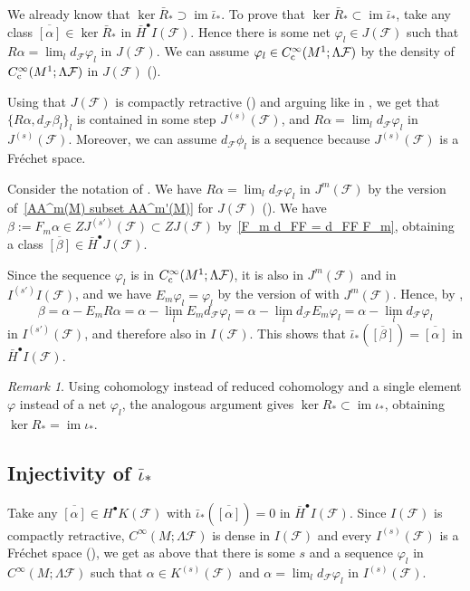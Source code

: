 \documentclass{memo-l}
\theoremstyle{plain}
\theoremstyle{definition}
\theoremstyle{remark}
\newtheorem{rem}[thm]{Remark}
\newcommand{\FF}{\mathcal{F}}
\newcommand{\im}{\operatorname{im}}
\newcommand{\Cinftyc}{C^\infty_{\text{\rm c}}}
\numberwithin{section}{chapter}
\numberwithin{equation}{section}%
\begin{document}
We already know that $\ker\bar R_*\supset\im\bar\iota_*$. To prove that $\ker\bar R_*\subset\im\bar\iota_*$, take any class $\overline{[\alpha]}\in\ker\bar R_*$ in $\bar H^\bullet I(\FF)$. Hence there is some net $\varphi_l\in J(\FF)$ such that $R\alpha=\lim_ld_\FF\varphi_l$ in $J(\FF)$. We can assume $\varphi_l\in\Cinftyc(M^1;\Lambda\FF)$ by the density of $\Cinftyc(M^1;\Lambda\FF)$ in $J(\FF)$ ().

Using that $J(\FF)$ is compactly retractive () and arguing like in , we get that $\{R\alpha,d_\FF\beta_l\}_l$ is contained in some step $J^{(s)}(\FF)$, and $R\alpha=\lim_ld_\FF\varphi_l$ in $J^{(s)}(\FF)$. Moreover, we can assume $d_\FF\phi_l$ is a sequence because $J^{(s)}(\FF)$ is a Fr\'echet space.

Consider the notation of . We have $R\alpha=\lim_l d_\FF\varphi_l$ in $J^m(\FF)$ by the version of~\eqref{AA^m(M) subset AA^m'(M)} for $J(\FF)$ (). We have $\beta:=F_m\alpha\in ZJ^{(s')}(\FF)\subset ZJ(\FF)$ by~\eqref{F_m d_FF = d_FF F_m}, obtaining a class $\overline{[\beta]}\in\bar H^\bullet J(\FF)$.

Since the sequence $\varphi_l$ is in $\Cinftyc(M^1;\Lambda\FF)$, it is also in $J^m(\FF)$ and in $I^{(s')}I(\FF)$, and we have $E_m\varphi_l=\varphi_l$ by the version of  with $J^m(\FF)$. Hence, by ,
\[
\beta=\alpha-E_mR\alpha=\alpha-\lim_lE_md_\FF\varphi_l=\alpha-\lim_ld_\FF E_m\varphi_l=\alpha-\lim_ld_\FF\varphi_l
\]
 in $I^{(s')}(\FF)$, and therefore also in $I(\FF)$. This shows that $\bar\iota_*(\overline{[\beta]})=\overline{[\alpha]}$ in $\bar H^\bullet I(\FF)$.
 
 \begin{rem}\label{r: ker R_* subset im iota_*}
Using cohomology instead of reduced cohomology and a single element $\varphi$ instead of a net $\varphi_l$, the analogous argument gives $\ker R_*\subset\im\iota_*$, obtaining $\ker R_*=\im\iota_*$.
 \end{rem}



\subsection{Injectivity of $\bar\iota_*$}\label{ss: injectivity of bar iota_*}

Take any $\overline{[\alpha]}\in H^\bullet K(\FF)$ with $\bar\iota_*(\overline{[\alpha]})=0$ in $\bar H^\bullet I(\FF)$. Since $I(\FF)$ is compactly retractive, $C^\infty(M;\Lambda\FF)$ is dense in $I(\FF)$ and every $I^{(s)}(\FF)$ is a Fr\'echet space (), we get as above that there is some $s$ and a sequence $\varphi_l$ in $C^\infty(M;\Lambda\FF)$ such that $\alpha\in K^{(s)}(\FF)$ and $\alpha=\lim_ld_\FF\varphi_l$ in $I^{(s)}(\FF)$. 
\end{document}
